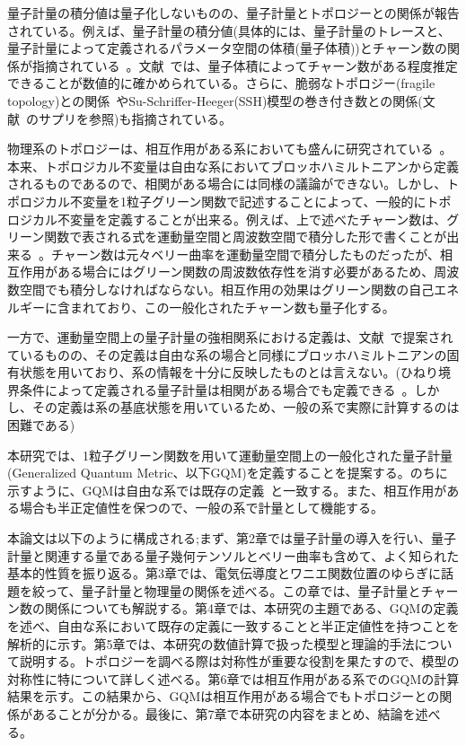 \documentclass[12pt]{jsbook}
\begin{document}
量子計量の積分値は量子化しないものの、量子計量とトポロジーとの関係が報告されている。例えば、量子計量の積分値(具体的には、量子計量のトレースと、量子計量によって定義されるパラメータ空間の体積(量子体積))とチャーン数の関係が指摘されている~\cite{Peotta2015,PhysRevB.104.045103, PhysRevB.103.L241102,Zhang_2022}。文献~\cite{PhysRevB.104.045103}では、量子体積によってチャーン数がある程度推定できることが数値的に確かめられている。さらに、脆弱なトポロジー(fragile topology)との関係~\cite{PhysRevLett.124.167002,PhysRevLett.126.027002}やSu-Schriffer-Heeger(SSH)模型の巻き付き数との関係(文献~\cite{PhysRevLett.124.167002}のサプリを参照)も指摘されている。

物理系のトポロジーは、相互作用がある系においても盛んに研究されている~\cite{Rachel_2018,Hohenadler_2013}。本来、トポロジカル不変量は自由な系においてブロッホハミルトニアンから定義されるものであるので、相関がある場合には同様の議論ができない。しかし、トポロジカル不変量を1粒子グリーン関数で記述することによって、一般的にトポロジカル不変量を定義することが出来る\cite{PhysRevLett.105.256803,PhysRevX.2.031008,article,PhysRevB.92.085126}。例えば、上で述べたチャーン数は、グリーン関数で表される式を運動量空間と周波数空間で積分した形で書くことが出来る~\cite{PhysRevLett.105.256803,PhysRevB.83.085426}。チャーン数は元々ベリー曲率を運動量空間で積分したものだったが、相互作用がある場合にはグリーン関数の周波数依存性を消す必要があるため、周波数空間でも積分しなければならない。相互作用の効果はグリーン関数の自己エネルギーに含まれており、この一般化されたチャーン数も量子化する。

一方で、運動量空間上の量子計量の強相関系における定義は、文献~\cite{10.21468/SciPostPhysCore.5.3.040}で提案されているものの、その定義は自由な系の場合と同様にブロッホハミルトニアンの固有状態を用いており、系の情報を十分に反映したものとは言えない。(ひねり境界条件によって定義される量子計量は相関がある場合でも定義できる~\cite{Resta2011, PhysRevB.62.1666, Raffaele_Resta_2002}。しかし、その定義は系の基底状態を用いているため、一般の系で実際に計算するのは
困難である)

本研究では、1粒子グリーン関数を用いて運動量空間上の一般化された量子計量(Generalized Quantum Metric、以下GQM)を定義することを提案する。のちに示すように、GQMは自由な系では既存の定義~\cite{PhysRevB.56.12847}と一致する。また、相互作用がある場合も半正定値性を保つので、一般の系で計量として機能する。

本論文は以下のように構成される;まず、第2章では量子計量の導入を行い、量子計量と関連する量である量子幾何テンソルとベリー曲率も含めて、よく知られた基本的性質を振り返る。第3章では、電気伝導度とワニエ関数位置のゆらぎに話題を絞って、量子計量と物理量の関係を述べる。この章では、量子計量とチャーン数の関係についても解説する。第4章では、本研究の主題である、GQMの定義を述べ、自由な系において既存の定義に一致することと半正定値性を持つことを解析的に示す。第5章では、本研究の数値計算で扱った模型と理論的手法について説明する。トポロジーを調べる際は対称性が重要な役割を果たすので、模型の対称性に特について詳しく述べる。第6章では相互作用がある系でのGQMの計算結果を示す。この結果から、GQMは相互作用がある場合でもトポロジーとの関係があることが分かる。最後に、第7章で本研究の内容をまとめ、結論を述べる。
\end{document}
